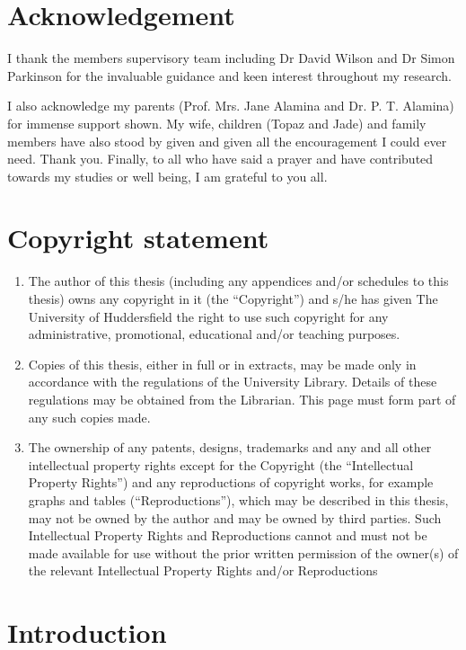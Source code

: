 \documentclass[12pt,twoside]{report}
\begin{document}
\chapter*{Acknowledgement}
I thank the members supervisory team including Dr David Wilson and Dr Simon Parkinson for the invaluable guidance and keen interest throughout my research.  

I also acknowledge my parents (Prof. Mrs. Jane Alamina and Dr. P. T. Alamina) for immense support shown.  My wife, children (Topaz and Jade) and family members have also stood by given and given all the encouragement I could ever need.  Thank you.  Finally, to all who have said a prayer and have contributed towards my studies or well being, I am grateful to you all.

\chapter*{Copyright statement}
\renewcommand{\theenumi}{\roman{enumi}}%
\begin{enumerate}
    \item The author of this thesis (including any appendices and/or schedules to this thesis) owns any copyright in it (the “Copyright”) and s/he has given The University of Huddersfield the right to use such copyright for any administrative, promotional, educational and/or teaching purposes.
    \item Copies of this thesis, either in full or in extracts, may be made only in accordance with the regulations of the University Library. Details of these regulations may be obtained from the Librarian. This page must form part of any such copies made.
    \item The ownership of any patents, designs, trademarks and any and all other intellectual property rights except for the Copyright (the “Intellectual Property Rights”) and any reproductions of copyright works, for example graphs and tables (“Reproductions”), which may be described in this thesis, may not be owned by the author and may be owned by third parties. Such Intellectual Property Rights and Reproductions cannot and must not be made available for use without the prior written permission of the owner(s) of the relevant Intellectual Property Rights and/or Reproductions
\end{enumerate}

\tableofcontents

\chapter{Introduction}\label{ch1_intro}

\end{document}
